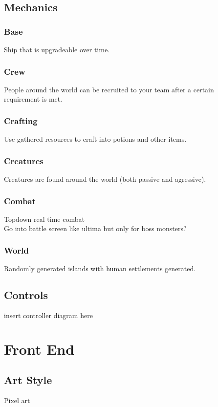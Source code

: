 \documentclass[a4paper]{scrreprt}
\begin{document}
\section{Mechanics}

\subsection{Base}
Ship that is upgradeable over time.

\subsection{Crew}
People around the world can be recruited to your team after a certain requirement is met.

\subsection{Crafting}
Use gathered resources to craft into potions and other items.

\subsection{Creatures}
Creatures are found around the world (both passive and agressive).

\subsection{Combat}
Topdown real time combat\\
Go into battle screen like ultima but only for boss monsters?

\subsection{World}
Randomly generated islands with human settlements generated.

\section{Controls}
insert controller diagram here




\chapter{Front End}

\section{Art Style}
Pixel art
\end{document}
